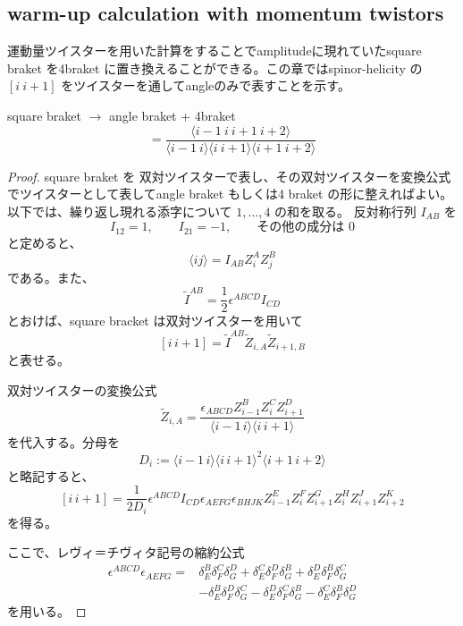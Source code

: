 \documentclass[uplatex,dvipdfmx,a4paper,11pt]{jsarticle}
\renewcommand{\proofname}{Proof}
\newenvironment{myproof}[1][\proofname]
  {\begin{proof}[#1]}
  {\end{proof}}
\numberwithin{equation}{section}
\begin{document}
\subsection{warm-up calculation with momentum twistors}
運動量ツイスターを用いた計算をすることでamplitudeに現れていたsquare braket を4braket に置き換えることができる。この章ではspinor-helicity の$[i\ i+1]$ をツイスターを通してangleのみで表すことを示す。
\begin{mylemma}{square braket $\to$ angle braket + 4braket}
\begin{equation}
  [i\ i+1]
=
\frac{
\langle i-1\ i\ i+1\ i+2\rangle
}{
\langle i-1\ i\rangle
\langle i\ i+1\rangle
\langle i+1\ i+2\rangle
}
\end{equation}
\end{mylemma}
\begin{myproof}
  square braket を 双対ツイスターで表し、その双対ツイスターを変換公式でツイスターとして表してangle braket もしくは4 braket の形に整えればよい。\\
  以下では、繰り返し現れる添字について $1,\ldots,4$ の和を取る。
  反対称行列 $I_{AB}$ を
  \[
    I_{12}=1,\qquad I_{21}=-1,
    \qquad \text{その他の成分は }0
  \]
  と定めると、
  \[
    \langle ij\rangle=I_{AB}Z_i^A Z_j^B
  \]
  である。また、
  \[
    \widetilde I^{AB}
      =\frac12\epsilon^{ABCD}I_{CD}
  \]
  とおけば、square bracket は双対ツイスターを用いて
  \[
    [i\,i+1]
      =\widetilde I^{AB}
        \widetilde Z_{i,A}\widetilde Z_{i+1,B}
  \]
  と表せる。

  双対ツイスターの変換公式
  \[
    \widetilde Z_{i,A}
      =
      \frac{
        \epsilon_{ABCD}
        Z_{i-1}^B Z_i^C Z_{i+1}^D
      }{
        \langle i-1\,i\rangle
        \langle i\,i+1\rangle
      }
  \]
  を代入する。分母を
  \[
    D_i:=
      \langle i-1\,i\rangle
      \langle i\,i+1\rangle^2
      \langle i+1\,i+2\rangle
  \]
  と略記すると、
  \[
    [i\,i+1]
      =
      \frac{1}{2D_i}
      \epsilon^{ABCD}I_{CD}
      \epsilon_{AEFG}\epsilon_{BHJK}
      Z_{i-1}^E Z_i^F Z_{i+1}^G
      Z_i^H Z_{i+1}^J Z_{i+2}^K
  \]
  を得る。

  ここで、レヴィ＝チヴィタ記号の縮約公式
  \[
    \begin{aligned}
      \epsilon^{ABCD}\epsilon_{AEFG}
      ={}&
      \delta_E^B\delta_F^C\delta_G^D
      +\delta_E^C\delta_F^D\delta_G^B
      +\delta_E^D\delta_F^B\delta_G^C\\
      &-\delta_E^B\delta_F^D\delta_G^C
      -\delta_E^D\delta_F^C\delta_G^B
      -\delta_E^C\delta_F^B\delta_G^D
    \end{aligned}
  \]
  を用いる。


\end{myproof}
\end{document}
